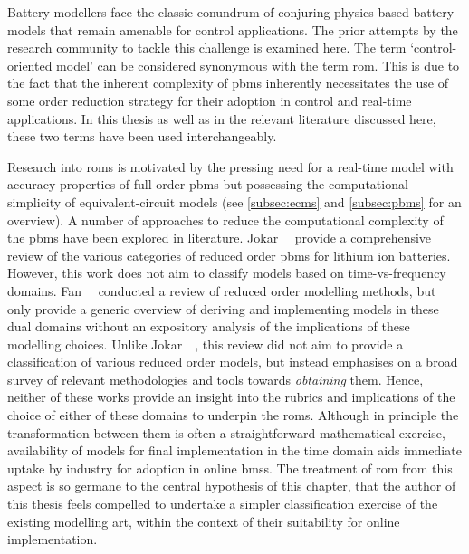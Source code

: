 

Battery modellers face the classic  conundrum of conjuring physics-based battery
models that remain amenable for control  applications. The prior attempts by the
research  community  to  tackle  this  challenge  is  examined  here.  The  term
`control-oriented model' can  be considered synonymous with  the term \gls{rom}.
This is due  to the fact that the inherent  complexity of \glspl{pbm} inherently
necessitates the  use of  some order  reduction strategy  for their  adoption in
control and  real-time applications. In this  thesis as well as  in the relevant
literature discussed here, these two terms have been used interchangeably.

Research into  \glspl{rom} is  motivated by  the pressing  need for  a real-time
model  with accuracy  properties of  full-order \glspl{pbm}  but possessing  the
computational  simplicity of  equivalent-circuit models  (see \cref{subsec:ecms}
and \cref{subsec:pbms}  for an overview). A  number of approaches to  reduce the
computational complexity  of the \glspl{pbm}  have been explored  in literature.
Jokar~\etal~\cite{Jokar2016}  provide  a  comprehensive review  of  the  various
categories of reduced order \glspl{pbm} for lithium ion batteries. However, this
work  does  not aim  to  classify  models  based on  time-vs-frequency  domains.
Fan~\etal{}~\cite{Fan2015}  conducted  a  review   of  reduced  order  modelling
methods, but only provide a generic overview of deriving and implementing models
in these  dual domains  without an  expository analysis  of the  implications of
these modelling  choices. Unlike  Jokar~\etal~\cite{Jokar2016}, this  review did
not aim to provide a classification of various reduced order models, but instead
emphasises  on  a broad  survey  of  relevant  methodologies and  tools  towards
\emph{obtaining} them.  Hence, neither  of these works  provide an  insight into
the  rubrics and  implications  of the  choice  of either  of  these domains  to
underpin  the  \glspl{rom}. Although  in  principle  the transformation  between
them  is  often  a straightforward  mathematical  exercise,  availability of models for final  implementation in the time domain aids
immediate uptake by  industry for adoption in online  \glspl{bms}. The treatment
of \gls{rom} from  this aspect is so  germane to the central  hypothesis of this
chapter, that the author
of this thesis feels compelled to undertake a simpler classification exercise of
the existing modelling  art, within the context of their  suitability for online
implementation.


